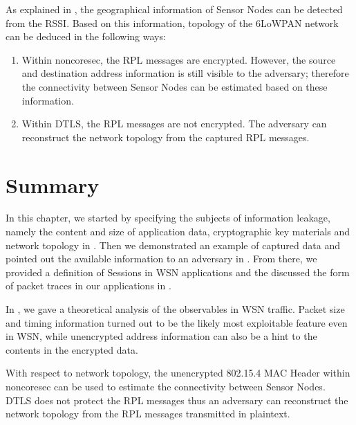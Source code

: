As explained in , the geographical information of Sensor Nodes can be detected from the RSSI. Based on this information, topology of the 6LoWPAN network can be deduced in the following ways:

\begin{enumerate}
	\item Within noncoresec, the RPL messages are encrypted. However, the source and destination address information is still visible to the adversary; therefore the connectivity between Sensor Nodes can be estimated based on these information.
	\item Within DTLS, the RPL messages are not encrypted. The adversary can reconstruct the network topology from the captured RPL messages.
\end{enumerate}

\section{Summary}

In this chapter, we started by specifying the subjects of information leakage, namely the content and size of application data, cryptographic key materials and network topology in . Then we demonstrated an example of captured data and pointed out the available information to an adversary in . From there, we provided a definition of Sessions in WSN applications and the discussed the form of packet traces in our applications in .

In , we gave a theoretical analysis of the observables in WSN traffic. Packet size and timing information turned out to be the likely most exploitable feature even in WSN, while unencrypted address information can also be a hint to the contents in the encrypted data.

With respect to network topology, the unencrypted 802.15.4 MAC Header within noncoresec can be used to estimate the connectivity between Sensor Nodes. DTLS does not protect the RPL messages thus an adversary can reconstruct the network topology from the RPL messages transmitted in plaintext.